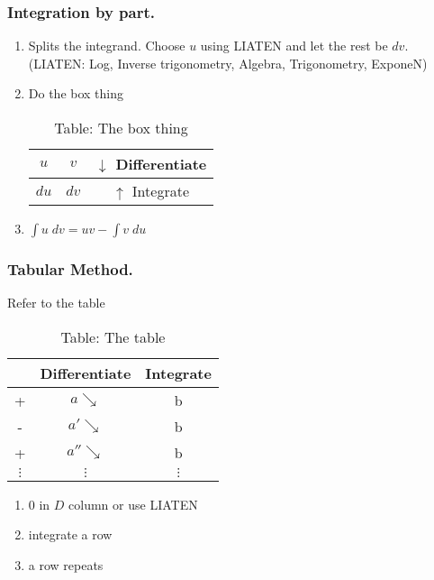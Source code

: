 \documentclass[../main.tex]{subfiles}
\begin{document}
\subsubsection*{Integration by part.}
\begin{enumerate}
    \item Splits the integrand. Choose $u$ using LIATEN and let the rest be $dv$. (LIATEN: Log, Inverse trigonometry, Algebra, Trigonometry, ExponeN)
    \item Do the box thing
    \begin{table*}[h]
        \begin{center}
    \caption*{Table: The box thing}
    \begin{tabular}{c || c || c}
        $u$&$v$&$\downarrow$ Differentiate\\ 
        \hline\hline
        $du$&$dv$&$\uparrow$ Integrate
    \end{tabular}
        \end{center}
    \end{table*}
    \item $ \int u \;dv = uv - \int v\; du$
\end{enumerate}

\subsubsection*{Tabular Method.} Refer to the table
\begin{table*}[h]
\begin{center}
\caption*{Table: The table}
\begin{tabular}{c || c || c}
    &Differentiate&Integrate \\ 
    \hline\hline
    +&$a\searrow$&b \\ 
    \hline\hline
    -&$a'\searrow$&b \\ 
    \hline\hline
    +&$a''\searrow$&b \\ 
    \hline\hline
    $\vdots$&$\vdots$&$\vdots$
\end{tabular}
\end{center}
\end{table*}

\begin{enumerate}
    \item 0 in $D$ column or use LIATEN
    \item integrate a row 
    \item a row repeats
\end{enumerate}
\end{document}

